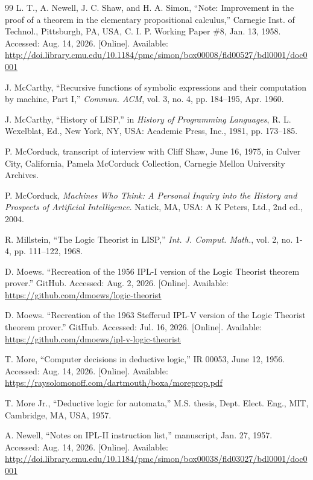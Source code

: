 \documentclass[journal]{IEEEtran}
\begin{document}
\begin{thebibliography}{99}
 L. T., A. Newell, J. C. Shaw, and H. A. Simon,
  ``Note: Improvement in the proof of a theorem in the elementary
  propositional calculus,''
  Carnegie Inst. of Technol., Pittsburgh, PA, USA,
  C. I. P. Working Paper \#8, Jan. 13, 1958.
  Accessed: Aug. 14, 2026.  [Online].
  Available: \url{http://doi.library.cmu.edu/10.1184/pmc/simon/box00008/fld00527/bdl0001/doc0001}

 J. McCarthy, ``Recursive functions of
  symbolic expressions and their computation by machine, Part I,''
  \textit{Commun. ACM}, vol. 3, no. 4, pp. 184--195, Apr. 1960.

 J. McCarthy, ``History of LISP,'' in
  \textit{History of Programming Languages}, R. L. Wexelblat, Ed.,
  New York, NY, USA: Academic Press, Inc., 1981, pp. 173--185.

 P. McCorduck, transcript of interview
  with Cliff Shaw, June 16, 1975, in Culver City, California,
  Pamela McCorduck Collection, Carnegie Mellon University Archives.

 P. McCorduck, \textit{Machines Who
  Think: A Personal Inquiry into the History and Prospects
  of Artificial Intelligence}. Natick, MA, USA: A K Peters, Ltd., 2nd ed., 2004.

 R. Millstein, ``The Logic Theorist in
  LISP,'' \textit{Int. J. Comput. Math.},
  vol. 2, no. 1-4, pp. 111--122, 1968.

 D. Moews.
  ``Recreation of the 1956 IPL-I version of the Logic Theorist theorem
  prover.''
  GitHub.
  Accessed: Aug. 2, 2026.  [Online].
  Available: \url{https://github.com/dmoews/logic-theorist}

 D. Moews.
  ``Recreation of the 1963 Stefferud IPL-V version of the Logic Theorist
  theorem prover.''
  GitHub.
  Accessed: Jul. 16, 2026.  [Online].
  Available: \url{https://github.com/dmoews/ipl-v-logic-theorist}

 T. More,
  ``Computer decisions in deductive logic,'' IR 00053, June 12, 1956.
  Accessed: Aug. 14, 2026.  [Online].
  Available: \url{https://raysolomonoff.com/dartmouth/boxa/moreprop.pdf}

 T. More Jr., ``Deductive logic for automata,''
  M.S. thesis,
  Dept. Elect. Eng., MIT, Cambridge, MA, USA, 1957.

 A. Newell, ``Notes on IPL-II instruction list,''
  manuscript, Jan. 27, 1957.
  Accessed: Aug. 14, 2026.  [Online].
  Available: \url{http://doi.library.cmu.edu/10.1184/pmc/simon/box00038/fld03027/bdl0001/doc0001}


\end{thebibliography}
\end{document}
